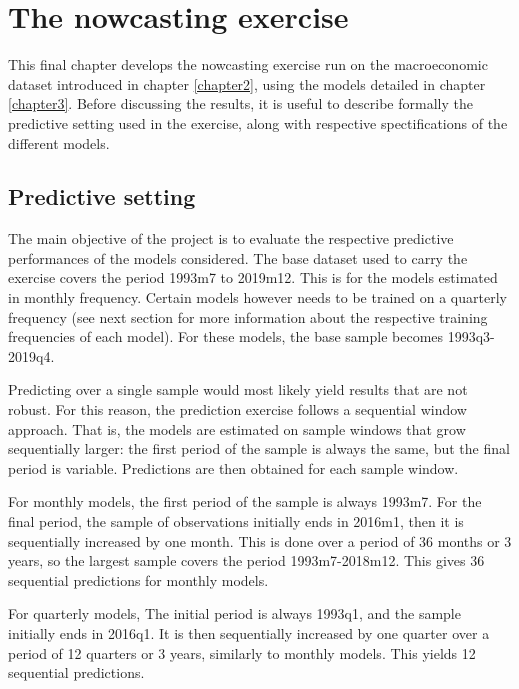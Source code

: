 \chapter{The nowcasting exercise}
\label{chapter4}


This final chapter develops the nowcasting exercise run on the macroeconomic dataset introduced in chapter \ref{chapter2}, using the models detailed in chapter \ref{chapter3}. Before discussing the results, it is useful to describe formally the predictive setting used in the exercise, along with respective spectifications of the different models.


\section{Predictive setting}
\label{chapter4_section1}


The main objective of the project is to evaluate the respective predictive performances of the models considered. The base dataset used to carry the exercise covers the period 1993m7 to 2019m12. This is for the models estimated in monthly frequency. Certain models however needs to be trained on a quarterly frequency (see next section for more information about the respective training frequencies of each model). For these models, the base sample becomes 1993q3-2019q4.

Predicting over a single sample would most likely yield results that are not robust. For this reason, the prediction exercise follows a sequential window approach. That is, the models are estimated on sample windows that grow sequentially larger: the first period of the sample is always the same, but the final period is variable. Predictions are then obtained for each sample window.

For monthly models, the first period of the sample is always 1993m7. For the final period, the sample of observations initially ends in 2016m1, then it is sequentially increased by one month. This is done over a period of 36 months or 3 years, so the largest sample covers the period 1993m7-2018m12. This gives 36 sequential predictions for monthly models.

For quarterly models, The initial period is always 1993q1, and the sample initially ends in 2016q1. It is then sequentially increased by one quarter over a period of 12 quarters or 3 years, similarly to monthly models. This yields 12 sequential predictions.

\newpage

